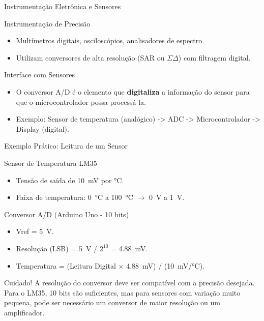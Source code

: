 \documentclass{beamer}
\begin{document}
\begin{frame}{Instrumentação Eletrônica e Sensores}
    \begin{block}{Instrumentação de Precisão}
        \begin{itemize}
            \item Multímetros digitais, osciloscópios, analisadores de espectro.
            \item Utilizam conversores de alta resolução (SAR ou $\Sigma\Delta$) com filtragem digital.
        \end{itemize}
    \end{block}
    \begin{block}{Interface com Sensores}
        \begin{figure}
            \centering
        \end{figure}
        \begin{itemize}
            \item O conversor A/D é o elemento que \textbf{digitaliza} a informação do sensor para que o microcontrolador possa processá-la.
            \item Exemplo: Sensor de temperatura (analógico) -> ADC -> Microcontrolador -> Display (digital).
        \end{itemize}
    \end{block}
\end{frame}

\begin{frame}{Exemplo Prático: Leitura de um Sensor}
    \begin{block}{Sensor de Temperatura LM35}
        \begin{itemize}
            \item Tensão de saída de \SI{10}{\milli\volt} por \si{\celsius}.
            \item Faixa de temperatura: \SI{0}{\celsius} a \SI{100}{\celsius} $\rightarrow$ \SI{0}{V} a \SI{1}{V}.
        \end{itemize}
    \end{block}
    \begin{block}{Conversor A/D (Arduino Uno - 10 bits)}
        \begin{itemize}
            \item Vref = \SI{5}{V}.
            \item Resolução (LSB) = \SI{5}{V} / $2^{10}$ = \SI{4.88}{\milli\volt}.
            \item Temperatura = (Leitura Digital $\times$ \SI{4.88}{\milli\volt}) / (\SI{10}{\milli\volt}/\si{\celsius}).
        \end{itemize}
    \end{block}
    \begin{alertblock}{Cuidado!}
        A resolução do conversor deve ser compatível com a precisão desejada. Para o LM35, 10 bits são suficientes, mas para sensores com variação muito pequena, pode ser necessário um conversor de maior resolução ou um amplificador.
    \end{alertblock}
\end{frame}
\end{document}
